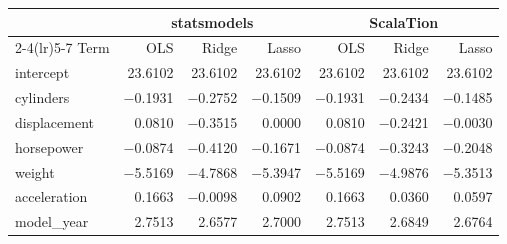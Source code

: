\begin{tabular}{@{}lrrrrrr@{}}
\toprule
 & \multicolumn{3}{c}{statsmodels} & \multicolumn{3}{c}{ScalaTion} \\
\cmidrule(lr){2-4}\cmidrule(lr){5-7}
Term & OLS & Ridge & Lasso & OLS & Ridge & Lasso \\
\midrule
intercept & 23.6102 & 23.6102 & 23.6102 & 23.6102 & 23.6102 & 23.6102 \\
cylinders & $-$0.1931 & $-$0.2752 & $-$0.1509 & $-$0.1931 & $-$0.2434 & $-$0.1485 \\
displacement & 0.0810 & $-$0.3515 & 0.0000 & 0.0810 & $-$0.2421 & $-$0.0030 \\
horsepower & $-$0.0874 & $-$0.4120 & $-$0.1671 & $-$0.0874 & $-$0.3243 & $-$0.2048 \\
weight & $-$5.5169 & $-$4.7868 & $-$5.3947 & $-$5.5169 & $-$4.9876 & $-$5.3513 \\
acceleration & 0.1663 & $-$0.0098 & 0.0902 & 0.1663 & 0.0360 & 0.0597 \\
model\_year & 2.7513 & 2.6577 & 2.7000 & 2.7513 & 2.6849 & 2.6764 \\
\bottomrule
\end{tabular}